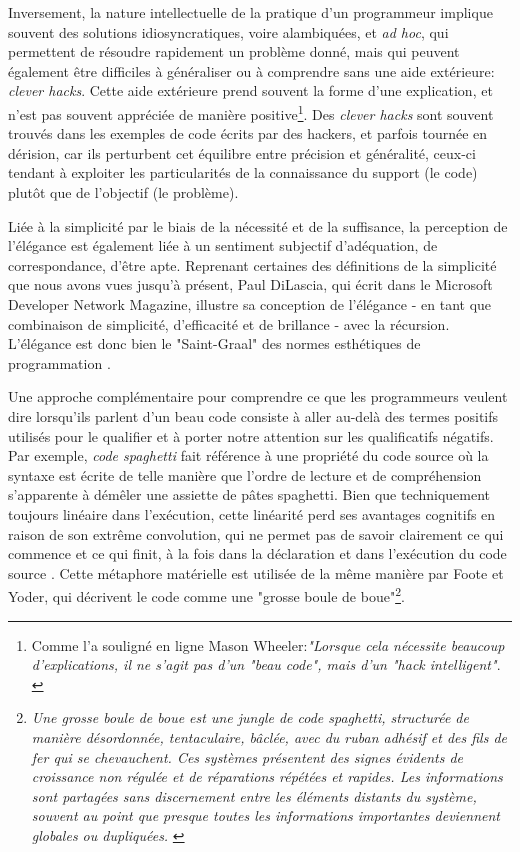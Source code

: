 \documentclass{article}
\begin{document}
Inversement, la nature intellectuelle de la pratique d'un programmeur implique souvent des solutions idiosyncratiques, voire alambiquées, et \emph{ad hoc}, qui permettent de résoudre rapidement un problème donné, mais qui peuvent également être difficiles à généraliser ou à comprendre sans une aide extérieure: \emph{clever hacks}. Cette aide extérieure prend souvent la forme d'une explication, et n'est pas souvent appréciée de manière positive\footnote{Comme l'a souligné en ligne Mason Wheeler:\emph{"Lorsque cela nécessite beaucoup d'explications, il ne s'agit pas d'un "beau code", mais d'un "hack intelligent"}. \citep{stackoverflow_how_2013}}. Des \emph{clever hacks} sont souvent trouvés dans les exemples de code écrits par des hackers, et parfois tournée en dérision, car ils perturbent cet équilibre entre précision et généralité, ceux-ci tendant à exploiter les particularités de la connaissance du support (le code) plutôt que de l'objectif (le problème).

Liée à la simplicité par le biais de la nécessité et de la suffisance, la perception de l'élégance est également liée à un sentiment subjectif d'adéquation, de correspondance, d'être apte. Reprenant certaines des définitions de la simplicité que nous avons vues jusqu'à présent, Paul DiLascia, qui écrit dans le Microsoft Developer Network Magazine, illustre sa conception de l'élégance - en tant que combinaison de simplicité, d'efficacité et de brillance - avec la récursion. L'élégance est donc bien le "Saint-Graal" des normes esthétiques de programmation \citep{temkin_less_2023}.

Une approche complémentaire pour comprendre ce que les programmeurs veulent dire lorsqu'ils parlent d'un beau code consiste à aller au-delà des termes positifs utilisés pour le qualifier et à porter notre attention sur les qualificatifs négatifs. Par exemple, \emph{code spaghetti} fait référence à une propriété du code source où la syntaxe est écrite de telle manière que l'ordre de lecture et de compréhension s'apparente à démêler une assiette de pâtes spaghetti. Bien que techniquement toujours linéaire dans l'exécution, cette linéarité perd ses avantages cognitifs en raison de son extrême convolution, qui ne permet pas de savoir clairement ce qui commence et ce qui finit, à la fois dans la déclaration et dans l'exécution du code source \citep{steele_macaroni_1977}. Cette métaphore matérielle est utilisée de la même manière par Foote et Yoder, qui décrivent le code comme une "grosse boule de boue"\footnote{\emph{Une grosse boule de boue est une jungle de code spaghetti, structurée de manière désordonnée, tentaculaire, bâclée, avec du ruban adhésif et des fils de fer qui se chevauchent. Ces systèmes présentent des signes évidents de croissance non régulée et de réparations répétées et rapides. Les informations sont partagées sans discernement entre les éléments distants du système, souvent au point que presque toutes les informations importantes deviennent globales ou dupliquées.} \citep{foote_big_1997}}.
\end{document}

